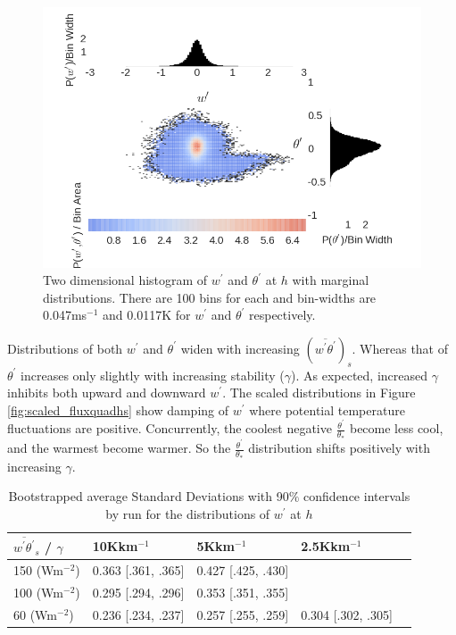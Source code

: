 \begin{figure}[htbp]
\centering
 \includegraphics[scale=.5]{figures/marg_dist}                 
\caption[]{Two dimensional histogram of $w^{'}$ and $\theta^{'}$ at $h$ with marginal distributions. There are 100 bins for each and bin-widths are 0.047ms$^{-1}$ and 0.0117K for $w^{'}$ and $\theta^{'}$ respectively.}
\label{fig:margdist}
\end{figure}

Distributions of both $w^{'}$ and $\theta^{'}$ widen with increasing $(\overline{w^{'}\theta^{'}})_{s}$.  Whereas that of $\theta^{'}$ increases only slightly with increasing stability ($\gamma$).  As expected, increased $\gamma$ inhibits both upward and downward $w^{'}$. The scaled distributions in Figure \ref{fig:scaled_fluxquadhs} show damping of $w^{'}$ where potential temperature fluctuations are positive. Concurrently, the coolest negative $\frac{\theta^{'}}{\theta_{*}}$ become less cool, and the warmest become warmer.  So the $\frac{\theta^{'}}{\theta_{*}}$ distribution shifts positively with increasing $\gamma$.\\ 


\begin{table}[htbp]
\caption[]{Bootstrapped average Standard Deviations with 90$\%$ confidence intervals by run for the distributions of $w^{'}$ at $h$}
 

    \begin{tabular}{ p{2.1cm} p{2.2cm}  p{2.2cm}  p{2.2cm} p{2.2cm} }
    
     $\overline{w^{'}\theta^{'}}_{s}$ / $\gamma$ & 10Kkm$^{-1}$ & 5Kkm$^{-1}$  & 2.5Kkm$^{-1}$   \\ \hline
     150 (Wm$^{-2}$)& 0.363 [.361, .365]& 0.427 [.425, .430] &  \\
     100 (Wm$^{-2}$)& 0.295 [.294, .296] & 0.353 [.351, .355]& \\
     60 (Wm$^{-2}$) & 0.236 [.234, .237]& 0.257 [.255, .259] & 0.304 [.302, .305]\\ \hline
     
    \end{tabular}

\label{tab:stdevw}   
    
\end{table}


